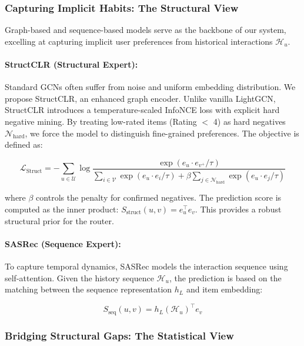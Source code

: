 \subsubsection{Capturing Implicit Habits: The Structural View}

Graph-based and sequence-based models serve as the backbone of our system, excelling at capturing implicit user preferences from historical interactions $\mathcal{H}_{u}$.

\paragraph{StructCLR (Structural Expert):} Standard GCNs often suffer from noise and uniform embedding distribution. We propose StructCLR, an enhanced graph encoder. Unlike vanilla LightGCN, StructCLR introduces a temperature-scaled InfoNCE loss with explicit hard negative mining. By treating low-rated items (Rating $<$ 4) as hard negatives $\mathcal{N}_{\mathrm{hard}}$, we force the model to distinguish fine-grained preferences. The objective is defined as:

\begin{equation}
\mathcal{L}_{\mathrm{Struct}} = - \sum_{u \in \mathcal{U}}^{}\log\frac{\exp\left( e_{u} \cdot e_{v^{+}}/\tau \right)}{\sum_{i \in \mathcal{V}}^{}\exp\left( e_{u} \cdot e_{i}/\tau \right) + \beta\sum_{j \in \mathcal{N}_{\mathrm{hard}}}^{}\exp\left( e_{u} \cdot e_{j}/\tau \right)}
\end{equation}

where $\beta$ controls the penalty for confirmed negatives. The prediction score is computed as the inner product: $S_{\mathrm{struct}}\left( u,v \right) = e_{u}^{\top}e_{v}$. This provides a robust structural prior for the router.

\paragraph{SASRec (Sequence Expert):} To capture temporal dynamics, SASRec models the interaction sequence using self-attention. Given the history sequence $\mathcal{H}_{u}$, the prediction is based on the matching between the sequence representation $h_{L}$ and item embedding:

\begin{equation}
S_{\mathrm{seq}}\left( u,v \right) = h_{L}\left( \mathcal{H}_{u} \right)^{\top}e_{v}
\end{equation}

\subsubsection{Bridging Structural Gaps: The Statistical View}


